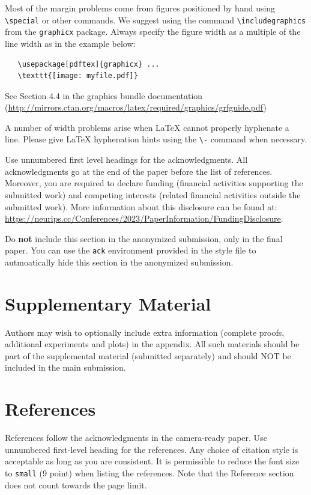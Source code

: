 \documentclass{article}
\begin{document}
Most of the margin problems come from figures positioned by hand using
\verb+\special+ or other commands. We suggest using the command
\verb+\includegraphics+ from the \verb+graphicx+ package. Always specify the
figure width as a multiple of the line width as in the example below:
\begin{verbatim}
   \usepackage[pdftex]{graphicx} ...
   \texttt{[image: myfile.pdf]}
\end{verbatim}
See Section 4.4 in the graphics bundle documentation
(\url{http://mirrors.ctan.org/macros/latex/required/graphics/grfguide.pdf})


A number of width problems arise when \LaTeX{} cannot properly hyphenate a
line. Please give LaTeX hyphenation hints using the \verb+\-+ command when
necessary.


\begin{ack}
    Use unnumbered first level headings for the acknowledgments. All acknowledgments
    go at the end of the paper before the list of references. Moreover, you are required to declare
    funding (financial activities supporting the submitted work) and competing interests (related financial activities outside the submitted work).
    More information about this disclosure can be found at: \url{https://neurips.cc/Conferences/2023/PaperInformation/FundingDisclosure}.


    Do {\bf not} include this section in the anonymized submission, only in the final paper. You can use the \texttt{ack} environment provided in the style file to autmoatically hide this section in the anonymized submission.
\end{ack}



\section{Supplementary Material}

Authors may wish to optionally include extra information (complete proofs, additional experiments and plots) in the appendix. All such materials should be part of the supplemental material (submitted separately) and should NOT be included in the main submission.


\section*{References}


References follow the acknowledgments in the camera-ready paper. Use unnumbered first-level heading for
the references. Any choice of citation style is acceptable as long as you are
consistent. It is permissible to reduce the font size to \verb+small+ (9 point)
when listing the references.
Note that the Reference section does not count towards the page limit.
\medskip
\end{document}
